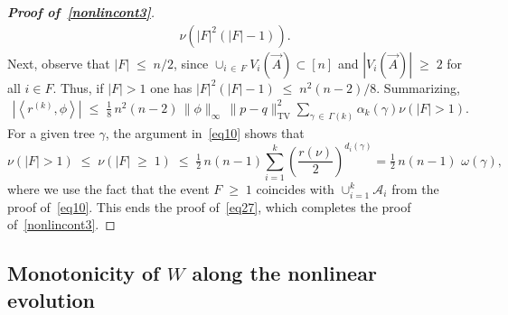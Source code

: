 \documentclass[AHL,Unicode,longabstracts,published]{cedram}
\renewcommand{\leq}{\;\leqslant\;}
\renewcommand{\geq}{\;\geqslant\;}
\newcommand{\tv}{\mathrm{TV}}
\newcommand{\cA}{\mathcal{A}}
\let\g=\gamma
\let\o=\omega
\begin{document}
\begin{proof}[{\bf Proof of~\eqref{nonlincont3}}]
\begin{align}
\nu\left(|F|^2(|F|-1)\right).
\end{align}
Next, observe that $|F|\leq n/2$, since $\cup_{i\,\in\,F}V_i(\vec A)\subset [n]$ and $|V_i(\vec A)|\geq 2$ for all $i\in F$. Thus, if $|F|>1$ one has $|F|^2(|F|-1)\leq n^2(n-2)/8$. Summarizing,
\begin{align}\label{eq2a87}
\left|\left\langle r^{(k)},\phi\right\rangle\right|\leq \tfrac{1}8\,n^2(n-2)\,\|\phi\|_\infty\,\|p-q\|_{\tv}^2 \sum_{\gamma\,\in\,\Gamma(k)}\alpha_k(\gamma)\nu(|F|>1).
\end{align}
For a given tree $\g$, the argument in~\eqref{eq10} shows that
\[
\nu(|F|>1)
\leq
\nu(|F|\geq 1) \leq
\tfrac12\,n(n-1)\sum_{i=1}^k\left(\frac{r(\nu)}{2}\right)^{d_i(\g)} = \tfrac12\,n(n-1)\,\,\o(\g),
\]
where we use the fact that the event $F\geq 1$ coincides with $\cup_{i=1}^k\cA_i$ from the proof of~\eqref{eq10}. This ends the proof of~\eqref{eq27}, which completes the proof of~\eqref{nonlincont3}.
\end{proof}


\subsection{Monotonicity of \texorpdfstring{$W$}{W} along the nonlinear evolution}
\end{document}
